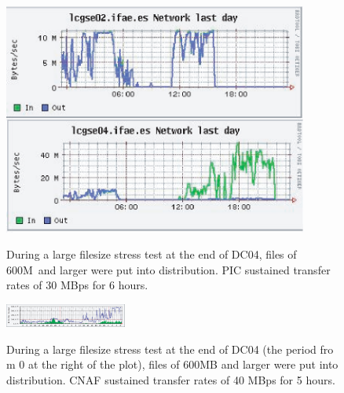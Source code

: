 \documentclass{cmspaper}
\begin{document}
\clearpage
\begin{figure}[tbp]
\centering
\includegraphics[angle=90,width=10cm]{PIC-stress.eps}
\label{fig:PIC-stress}
\caption{During a large filesize stress test at the end of DC04, files
 of 600M\ and larger were put into distribution. PIC sustained
 transfer rates of 30 MBps for 6 hours.}
\end{figure}
\clearpage
\begin{figure}[tbp]
\centering
\includegraphics[angle=90,width=4cm]{CNAF-stress.eps}
\label{fig:CNAF-stress}
\caption{During a large filesize stress test at the end of DC04 (the
period fro m 0 at the right of the plot), files of 600MB and larger
were put into distribution. CNAF sustained transfer rates of 40 MBps
for 5 hours.}
\end{figure}
\end{document}
